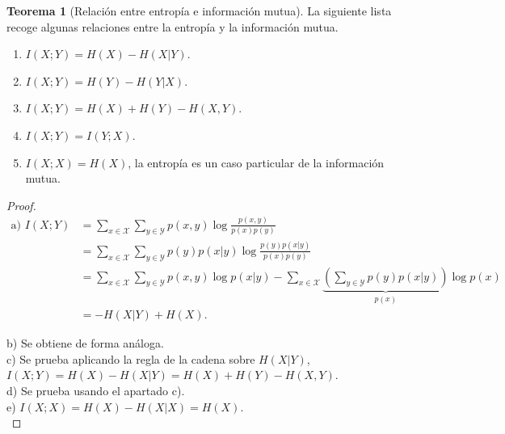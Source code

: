 \documentclass[12pt,a4paper]{report} %
\theoremstyle{definition}
\newtheorem{theorem}{Teorema}[section]
\begin{document}
\begin{theorem}[Relación entre entropía e información mutua]\label{t:ent_im}
  La siguiente lista recoge algunas relaciones entre la entropía y la información mutua.
\begin{enumerate}[label={\alph*)}]
  \item $I(X;Y) = H(X) - H(X|Y)$.
  \item $I(X;Y) = H(Y) - H(Y|X)$.
  \item $I(X;Y) = H(X) + H(Y) - H(X,Y)$.
  \item $I(X;Y) = I(Y;X)$.
  \item $I(X;X) = H(X)$, la entropía es un caso particular de la información mutua.
  \end{enumerate}
\end{theorem}
\begin{proof}
   
  \begin{align*}
    \text{a) }I(X;Y) &= \sum_{x \in \mathcal{X}}\sum_{y \in \mathcal{Y}}p(x,y) \log \frac{p(x,y)}{p(x)p(y)}\\[3pt] &= \sum_{x \in \mathcal{X}}\sum_{y \in \mathcal{Y}} p(y) p(x|y) \log \frac{p(y)p(x|y)}{p(x)p(y)}\\
    &= \sum_{x \in \mathcal{X}}\sum_{y \in \mathcal{Y}} p(x,y) \log p(x|y) - \sum_{x \in \mathcal{X}}\underbrace{\left ( \sum_{y \in \mathcal{Y}} p(y) p(x|y) \right)}_{p(x)} \log p(x)\\
    &= - H(X|Y) + H(X).
  \end{align*}
  
  b) Se obtiene de forma análoga.\\
  
  c) Se prueba aplicando la regla de la cadena sobre $H(X|Y)$, $I(X;Y) = H(X) - H(X|Y) = H(X) + H(Y) - H(X,Y)$.\\
  
  d) Se prueba usando el apartado c).\\
  
  e) $I(X;X) = H(X) - H(X|X) = H(X)$.\\
  
\end{proof}
\end{document}
